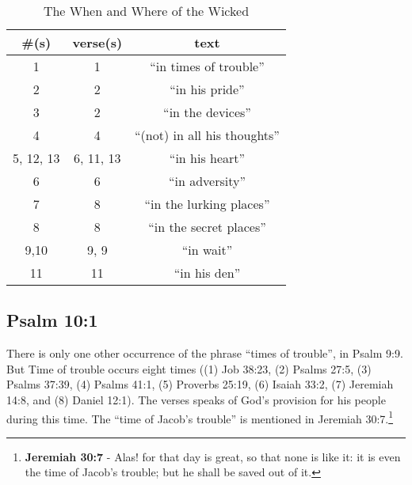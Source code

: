 \begin{table}[]
\begin{center}
\begin{tabular}{|c|c|c|}
\hline 
\#(s) & verse(s) & text \\ \hline 
1 & 1 & ``in times of trouble'' \\ \hline 
2 & 2 & ``in his pride'' \\ \hline 
3 & 2 & ``in the devices'' \\ \hline 
4 & 4 & ``(not) in all his thoughts'' \\ \hline 
5, 12, 13 & 6, 11, 13 & ``in  his heart'' \\ \hline 
6 & 6 & ``in adversity'' \\ \hline 
7 & 8 & ``in the lurking places'' \\ \hline 
8 & 8 & ``in the secret places'' \\ \hline 
9,10 & 9, 9 & ``in wait'' \\ \hline 
11 & 11 & ``in his den'' \\ \hline 
\end{tabular}

\label{table:WhenAndWhereOfTheWicked}
\caption[The When and Where of the Wicked]{The When and Where of the Wicked}
\end{center}
\end{table}


\subsection{Psalm 10:1}
There is only one other occurrence of the phrase ``times of trouble'', in Psalm 9:9. But Time of trouble occurs eight times ((1) Job 38:23, (2) Psalms 27:5, (3) Psalms 37:39, (4) Psalms 41:1, (5) Proverbs 25:19, (6) Isaiah 33:2, (7) Jeremiah 14:8, and (8) Daniel 12:1). The verses speaks of God's provision for his people during this time. The ``time of Jacob's trouble'' is mentioned in Jeremiah 30:7.\footnote{\textbf{Jeremiah 30:7} - Alas! for that day is great, so that none is like it: it is even the time of Jacob’s trouble; but he shall be saved out of it.}


